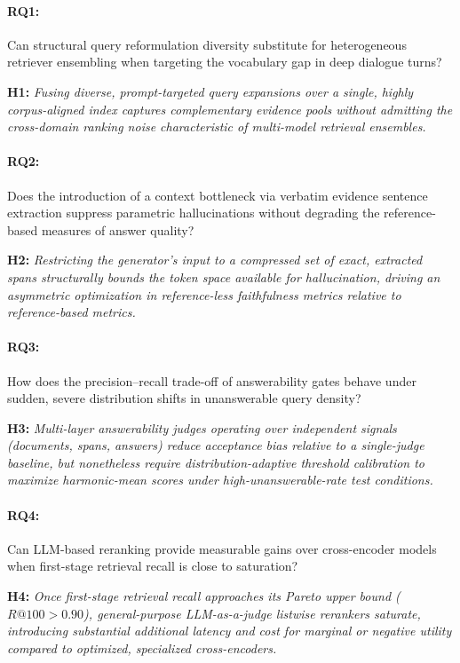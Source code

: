 \paragraph{RQ1:} Can structural query reformulation diversity substitute for heterogeneous retriever ensembling when targeting the vocabulary gap in deep dialogue turns?

\noindent \textbf{H1:} \textit{Fusing diverse, prompt-targeted query expansions over a single, highly corpus-aligned index captures complementary evidence pools without admitting the cross-domain ranking noise characteristic of multi-model retrieval ensembles.}

\paragraph{RQ2:} Does the introduction of a context bottleneck via verbatim evidence sentence extraction suppress parametric hallucinations without degrading the reference-based measures of answer quality?

\noindent \textbf{H2:} \textit{Restricting the generator's input to a compressed set of exact, extracted spans structurally bounds the token space available for hallucination, driving an asymmetric optimization in reference-less faithfulness metrics relative to reference-based metrics.}

\paragraph{RQ3:} How does the precision--recall trade-off of answerability gates behave under sudden, severe distribution shifts in unanswerable query density?

\noindent \textbf{H3:} \textit{Multi-layer answerability judges operating over independent signals (documents, spans, answers) reduce acceptance bias relative to a single-judge baseline, but nonetheless require distribution-adaptive threshold calibration to maximize harmonic-mean scores under high-unanswerable-rate test conditions.}

\paragraph{RQ4:} Can LLM-based reranking provide measurable gains over cross-encoder models when first-stage retrieval recall is close to saturation?

\noindent \textbf{H4:} \textit{Once first-stage retrieval recall approaches its Pareto upper bound ($R@100 > 0.90$), general-purpose LLM-as-a-judge listwise rerankers saturate, introducing substantial additional latency and cost for marginal or negative utility compared to optimized, specialized cross-encoders.}

